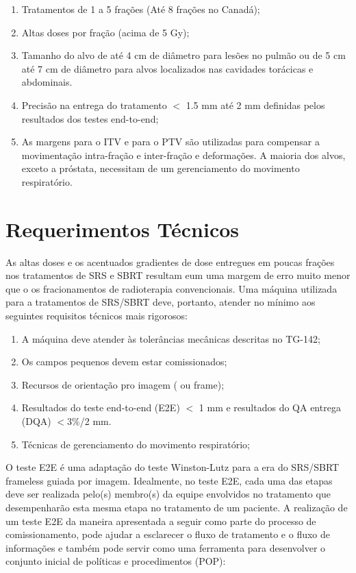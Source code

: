 \documentclass[11pt,a4paper]{article}
\begin{document}
	\begin{enumerate}[label=\textcolor{CarnationPink}{(\roman*)}]
		\item Tratamentos de 1 a 5 frações (Até 8 frações no Canadá);
		\item Altas doses por fração (acima de 5 Gy);
		\item Tamanho do alvo de até 4 cm de diâmetro para lesões no pulmão ou de 5 cm até 7 cm de diâmetro para alvos localizados nas cavidades torácicas e abdominais.
		\item Precisão na entrega do tratamento $<$ 1.5 mm até 2 mm definidas pelos resultados dos testes end-to-end;
		\item As margens para o ITV e para o PTV são utilizadas para compensar a movimentação intra-fração e inter-fração e deformações. A maioria dos alvos, exceto a próstata, necessitam de um gerenciamento do movimento respiratório.
	\end{enumerate}

\section{Requerimentos Técnicos}

	As altas doses e os acentuados gradientes de dose entregues em poucas frações nos tratamentos de SRS e SBRT resultam eum uma margem de erro muito menor que o os fracionamentos de radioterapia convencionais. Uma máquina utilizada para a tratamentos de SRS/SBRT deve, portanto, atender no mínimo aos seguintes requisitos técnicos mais rigorosos:

	\begin{enumerate}[label=\textcolor{CarnationPink}{(\roman*)}]
		\item A máquina deve atender às tolerâncias mecânicas descritas no TG-142;
		\item Os campos pequenos devem estar comissionados;
		\item Recursos de orientação pro imagem ( ou frame);
		\item Resultados do teste end-to-end (E2E) $<$ 1 mm e resultados do QA entrega (DQA) $<$3\%/2 mm.
		\item Técnicas de gerenciamento do movimento respiratório;
	\end{enumerate}

	O teste E2E é uma adaptação do teste Winston-Lutz para a era do SRS/SBRT frameless guiada por imagem. Idealmente, no teste E2E, cada uma das etapas deve ser realizada pelo(s) membro(s) da equipe envolvidos no tratamento que desempenharão esta mesma etapa no tratamento de um paciente. A realização de um teste E2E da maneira apresentada a seguir como parte do processo de comissionamento, pode ajudar a esclarecer o fluxo de tratamento e o fluxo de informações e também pode servir como uma ferramenta para desenvolver o conjunto inicial de políticas e procedimentos (POP):
\end{document}
